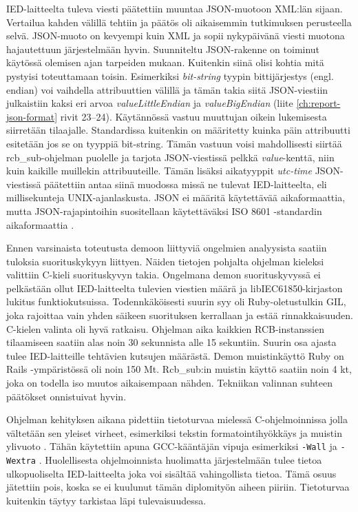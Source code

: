 IED-laitteelta tuleva viesti päätettiin muuntaa JSON-muotoon XML:län sijaan. Vertailua kahden välillä tehtiin ja päätös oli aikaisemmin tutkimuksen perusteella selvä. JSON-muoto on kevyempi kuin XML ja sopii nykypäivänä viesti muotona hajautettuun järjestelmään hyvin. Suunniteltu JSON-rakenne on toiminut käytössä olemisen ajan tarpeiden mukaan. Kuitenkin siinä olisi kohtia mitä pystyisi toteuttamaan toisin. Esimerkiksi \emph{bit-string} tyypin bittijärjestys (engl. endian) voi vaihdella attribuuttien välillä ja tämän takia siitä JSON-viestiin julkaistiin kaksi eri arvoa \emph{valueLittleEndian} ja \emph{valueBigEndian} (liite \ref{ch:report-json-format} rivit 23--24). Käytännössä vastuu muuttujan oikein lukemisesta siirretään tilaajalle. Standardissa kuitenkin on määritetty kuinka päin attribuutti esitetään jos se on tyyppiä bit-string. Tämän vastuun voisi mahdollisesti siirtää rcb\_sub-ohjelman puolelle ja tarjota JSON-viestissä pelkkä \emph{value}-kenttä, niin kuin kaikille muillekin attribuuteille. Tämän lisäksi aikatyyppit \emph{utc-time} JSON-viestissä päätettiin antaa siinä muodossa missä ne tulevat IED-laitteelta, eli millisekunteja UNIX-ajanlaskusta. JSON ei määritä käytettävää aikaformaattia, mutta JSON-rajapintoihin suositellaan käytettäväksi ISO 8601 -standardin aikaformaattia \cite{json-api-specification}.

Ennen varsinaista toteutusta demoon liittyviä ongelmien analyysista saatiin tuloksia suorituskykyyn liittyen. Näiden tietojen pohjalta ohjelman kieleksi valittiin C-kieli suorituskyvyn takia. Ongelmana demon suorituskyvyssä ei pelkästään ollut IED-laitteelta tulevien viestien määrä ja libIEC61850-kirjaston lukitus funktiokutsuissa. Todennkäköisesti suurin syy oli Ruby-oletustulkin GIL, joka rajoittaa vain yhden säikeen suorituksen kerrallaan ja estää rinnakkaisuuden. C-kielen valinta oli hyvä ratkaisu. Ohjelman aika kaikkien RCB-instanssien tilaamiseen saatiin alas noin 30 sekunnista alle 15 sekuntiin. Suurin osa ajasta tulee IED-laitteille tehtävien kutsujen määrästä. Demon muistinkäyttö Ruby on Rails -ympäristössä oli noin 150 Mt. Rcb\_sub:in muistin käyttö saatiin noin 4 kt, joka on todella iso muutos aikaisempaan nähden. Tekniikan valinnan suhteen päätökset onnistuivat hyvin.

Ohjelman kehityksen aikana pidettiin tietoturvaa mielessä C-ohjelmoinnissa jolla vältetään sen yleiset virheet, esimerkiksi tekstin formatointihyökkäys \cite{format-string-attack} ja muistin ylivuoto \cite{buffer-overflow-attack}. Tähän käytettiin apuna GCC-kääntäjän vipuja esimerkiksi \texttt{-Wall} ja \texttt{-Wextra} \cite{gcc-manual-warnings}. Huolellisesta ohjelmoinnista huolimatta järjestelmään tulee tietoa ulkopuoliselta IED-laitteelta joka voi sisältää vahingollista tietoa. Tämä osuus jätettiin pois, koska se ei kuulunut tämän diplomityön aiheen piiriin. Tietoturvaa kuitenkin täytyy tarkistaa läpi tulevaisuudessa.

